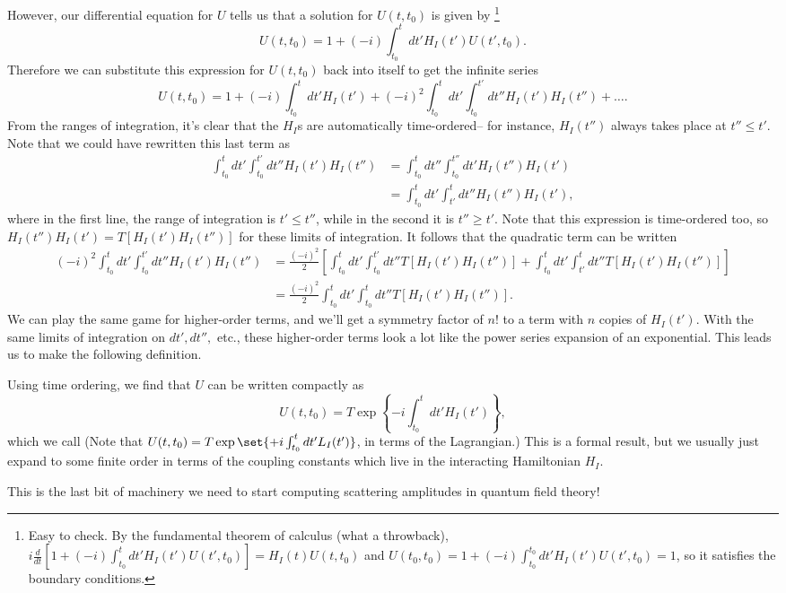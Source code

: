 However, our differential equation for $U$ tells us that a solution for $U(t,t_0)$ is given by%
    \footnote{Easy to check. By the fundamental theorem of calculus (what a throwback), $i\frac{d}{dt}\left[1+(-i)\int_{t_0}^t dt' H_I(t')U(t',t_0)\right] =H_I(t)U(t,t_0)$ and $U(t_0,t_0)=1+(-i)\int_{t_0}^{t_0} dt' H_I(t')U(t',t_0)=1$, so it satisfies the boundary conditions.
    }
$$U(t,t_0)=1+(-i)\int_{t_0}^t dt' H_I(t')U(t',t_0).$$
%
Therefore we can substitute this expression for $U(t,t_0)$ back into itself to get the infinite series
$$U(t,t_0)=1+(-i)\int_{t_0}^t dt' H_I(t')+(-i)^2 \int_{t_0}^t dt' \int_{t_0}^{t'} dt'' H_I(t')H_I(t'')+\ldots.$$
From the ranges of integration, it's clear that the $H_I$s are automatically time-ordered-- for instance, $H_I(t'')$ always takes place at $t''\leq t'$. Note that we could have rewritten this last term as
\begin{align*}
    \int_{t_0}^t dt' \int_{t_0}^{t'} dt'' H_I(t')H_I(t'') &=
        \int_{t_0}^t dt'' \int_{t_0}^{t''} dt' H_I(t'')H_I(t')\\
    &=\int_{t_0}^t dt' \int_{t'}^t dt'' H_I(t'')H_I(t'),
\end{align*}
where in the first line, the range of integration is $t'\leq t''$, while in the second it is $t'' \geq t'$. Note that this expression is time-ordered too, so $H_I(t'')H_I(t')=T[H_I(t')H_I(t'')]$ for these limits of integration. It follows that the quadratic term can be written
\begin{align*}
    (-i)^2\int_{t_0}^t dt' \int_{t_0}^{t'} dt'' H_I(t')H_I(t'') &=
        \frac{(-i)^2}{2}\left[\int_{t_0}^t dt' \int_{t_0}^{t'} dt'' T[H_I(t')H_I(t'')]
        +\int_{t_0}^t dt' \int_{t'}^t dt'' T[H_I(t')H_I(t'')]\right]\\
    &=\frac{(-i)^2}{2} \int_{t_0}^t dt' \int_{t_0}^t dt'' T[H_I(t') H_I(t'')].
\end{align*}%
We can play the same game for higher-order terms, and we'll get a symmetry factor of $n!$ to a term with $n$ copies of $H_I(t')$. With the same limits of integration on $dt',dt'',$ etc., these higher-order terms look a lot like the power series expansion of an exponential. This leads us to make the following definition.
\begin{defn}
Using time ordering, we find that $U$ can be written compactly as
$$U(t,t_0)=T \exp \left\{-i\int_{t_0}^t dt' H_I(t')\right\},$$
which we call  (Note that $U(t,t_0)=T \exp \set{+i\int_{t_0}^t dt' L_I(t')}$, in terms of the Lagrangian.) This is a formal result, but we usually just expand to some finite order in terms of the coupling constants which live in the interacting Hamiltonian $H_I$.
\end{defn}
This is the last bit of machinery we need to start computing scattering amplitudes in quantum field theory!

